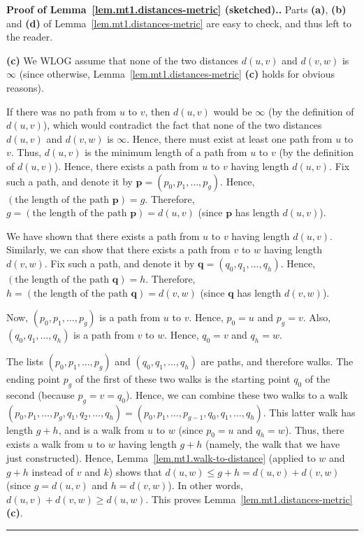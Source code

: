\documentclass[numbers=enddot,12pt,final,onecolumn,notitlepage]{scrartcl}%
\theoremstyle{definition}
\newenvironment{proof}[1][Proof]{\noindent\textbf{#1.} }{\ \rule{0.5em}{0.5em}}
\newcommand{\tup}[1]{\left( #1 \right)}
\begin{document}
\begin{proof}[Proof of Lemma~\ref{lem.mt1.distances-metric}
(sketched).]
Parts \textbf{(a)}, \textbf{(b)} and \textbf{(d)} of
Lemma~\ref{lem.mt1.distances-metric} are easy to check, and thus left
to the reader.

\textbf{(c)} We WLOG assume that none of the two distances
$d \tup{u, v}$ and $d \tup{v, w}$ is $\infty$ (since otherwise,
Lemma~\ref{lem.mt1.distances-metric} \textbf{(c)} holds for obvious
reasons).

If there was no path from $u$ to $v$, then $d \tup{u, v}$ would be
$\infty$ (by the definition of $d \tup{u, v}$), which would contradict
the fact that none of the two distances
$d \tup{u, v}$ and $d \tup{v, w}$ is $\infty$. Hence, there must exist
at least one path from $u$ to $v$. Thus,
$d \tup{u, v}$ is the minimum length of a path from $u$ to $v$ (by the
definition of $d \tup{u, v}$). Hence, there exists a path from $u$ to
$v$ having length $d \tup{u, v}$. Fix such a path, and denote it by
$\mathbf{p} = \tup{p_0, p_1, \ldots, p_g}$. Hence,
$\tup{\text{the length of the path } \mathbf{p}} = g$. Therefore,
$g = \tup{\text{the length of the path } \mathbf{p}} = d \tup{u, v}$
(since $\mathbf{p}$ has length $d \tup{u, v}$).

We have shown that there exists a path from $u$ to
$v$ having length $d \tup{u, v}$. Similarly, we can show that there
exists a path from $v$ to $w$ having length $d \tup{v, w}$. Fix such
a path, and denote it by
$\mathbf{q} = \tup{q_0, q_1, \ldots, q_h}$. Hence,
$\tup{\text{the length of the path } \mathbf{q}} = h$. Therefore,
$h = \tup{\text{the length of the path } \mathbf{q}} = d \tup{v, w}$
(since $\mathbf{q}$ has length $d \tup{v, w}$).

Now, $\tup{p_0, p_1, \ldots, p_g}$ is a path from $u$ to $v$. Hence,
$p_0 = u$ and $p_g = v$.
Also, $\tup{q_0, q_1, \ldots, q_h}$ is a path from $v$ to $w$. Hence,
$q_0 = v$ and $q_h = w$.

The lists $\tup{p_0, p_1, \ldots, p_g}$ and
$\tup{q_0, q_1, \ldots, q_h}$ are paths, and therefore walks. The
ending point $p_g$ of the first of these two walks is the starting
point $q_0$ of the second (because $p_g = v = q_0$).
Hence, we can combine these two walks to a walk
$\tup{p_0, p_1, \ldots, p_g, q_1, q_2, \ldots, q_h}
= \tup{p_0, p_1, \ldots, p_{g-1}, q_0, q_1, \ldots, q_h}$. This latter
walk has length $g + h$, and is a walk from $u$ to $w$ (since
$p_0 = u$ and $q_h = w$). Thus, there exists a walk from $u$ to $w$
having length $g + h$ (namely, the walk that we have just
constructed). Hence,
Lemma~\ref{lem.mt1.walk-to-distance} (applied to $w$ and $g + h$
instead of $v$ and $k$) shows that $d \tup{u, w} \leq g + h
= d \tup{u, v} + d \tup{v, w}$ (since $g = d \tup{u, v}$ and
$h = d \tup{v, w}$). In other words,
$d \tup{u, v} + d \tup{v, w} \geq d \tup{u, w}$.
This proves Lemma~\ref{lem.mt1.distances-metric} \textbf{(c)}.
\end{proof}
\end{document}
